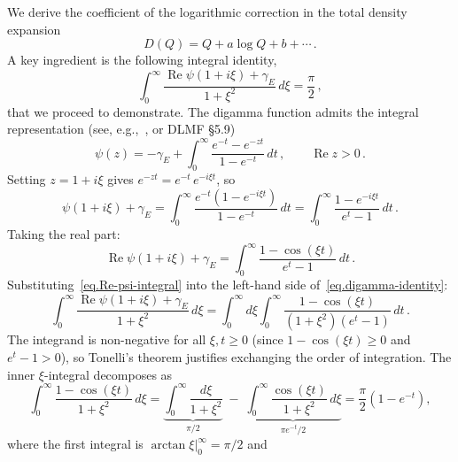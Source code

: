 \documentclass[11pt,a4paper]{article}
\theoremstyle{definition}
\begin{document}
We derive the coefficient of the logarithmic correction in the total density expansion
\begin{equation}\label{eq.D-expansion}
  D(Q) = Q + a\log Q + b + \cdots\,.
\end{equation}
A key ingredient is the following integral identity, 
\begin{equation}\label{eq.digamma-identity}
  \int_0^{\infty}
  \frac{\operatorname{Re}\psi(1+i\xi) + \gamma_E}{1+\xi^2}\,d\xi
  = \frac{\pi}{2}\,,
\end{equation}
that we proceed to demonstrate. 
The digamma function admits the integral representation
(see, e.g.,~\cite{Gaudin2014}, or DLMF \S5.9)
\begin{equation}\label{eq.digamma-int-rep}
  \psi(z) = -\gamma_E + \int_0^{\infty}
  \frac{e^{-t} - e^{-zt}}{1 - e^{-t}}\,dt\,,
  \qquad \operatorname{Re} z > 0\,.
\end{equation}
Setting $z = 1 + i\xi$ gives $e^{-zt} = e^{-t}\,e^{-i\xi t}$, so
\begin{equation}
  \psi(1 + i\xi) + \gamma_E
  = \int_0^{\infty} \frac{e^{-t}(1 - e^{-i\xi t})}{1 - e^{-t}}\,dt
  = \int_0^{\infty} \frac{1 - e^{-i\xi t}}{e^{t} - 1}\,dt\,.
\end{equation}
Taking the real part:
\begin{equation}\label{eq.Re-psi-integral}
  \operatorname{Re}\psi(1 + i\xi) + \gamma_E
  = \int_0^{\infty} \frac{1 - \cos(\xi t)}{e^{t} - 1}\,dt\,.
\end{equation}
Substituting~\eqref{eq.Re-psi-integral} into the left-hand side
of~\eqref{eq.digamma-identity}:
\begin{equation}\label{eq.double-integral}
  \int_0^{\infty} \frac{\operatorname{Re}\psi(1+i\xi)+\gamma_E}{1+\xi^2}\,d\xi
  = \int_0^{\infty}  d\xi \int_0^{\infty}
    \frac{1 - \cos(\xi t)}{(1+\xi^2)(e^t - 1)}\,dt\,.
\end{equation}
The integrand is non-negative for all $\xi, t \geq 0$
(since $1 - \cos(\xi t) \geq 0$ and $e^t - 1 > 0$),
so Tonelli's theorem justifies exchanging the order of integration.
The inner $\xi$-integral decomposes as
\begin{equation}\label{eq.xi-integral}
  \int_0^{\infty} \frac{1 - \cos(\xi t)}{1+\xi^2}\,d\xi
  = \underbrace{\int_0^{\infty} \frac{d\xi}{1+\xi^2}}_{\pi/2}
  \;-\; \underbrace{\int_0^{\infty} \frac{\cos(\xi t)}{1+\xi^2}\,d\xi}_{\pi e^{-t}/2}
  = \frac{\pi}{2}\left(1 - e^{-t}\right),
\end{equation}
where the first integral is $\arctan\xi\big|_0^{\infty} = \pi/2$ and
\end{document}
